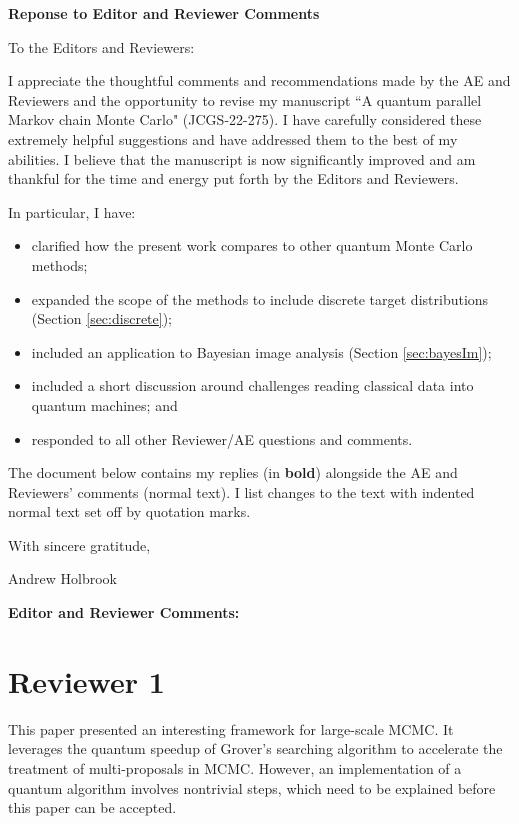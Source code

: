 \documentclass[12pt]{article}
\def\paperTitle{A quantum parallel Markov chain Monte Carlo}
\def\paperID{JCGS-22-275}
\begin{document}


\centerline{\large \bf Reponse to Editor and Reviewer Comments}

To the Editors and Reviewers:

I appreciate the thoughtful comments and recommendations made by the AE and Reviewers and the opportunity to revise my manuscript ``\paperTitle" (\paperID).
I have carefully considered these extremely helpful suggestions and have addressed them to the best of my abilities.  I believe that the manuscript is now significantly improved and am thankful for the time and energy put forth by the Editors and Reviewers.

In particular, I have:
\begin{itemize}
	\item clarified how the present work compares to other quantum Monte Carlo methods;
	
	\item expanded the scope of the methods to include discrete target distributions (Section \ref{sec:discrete});
	
	\item included an application to Bayesian image analysis (Section \ref{sec:bayesIm});
	
	\item included a short discussion around challenges reading classical data into quantum machines; and
	
	\item responded to all other Reviewer/AE questions and comments.
\end{itemize}


The document below contains my replies (in \textbf{bold}) alongside the AE and Reviewers' comments (normal text).  I list changes to the text with indented normal text set off by quotation marks.

With sincere gratitude,

Andrew Holbrook
\clearpage


{\Large \bf Editor and Reviewer Comments:}


\section*{Reviewer 1}


This paper presented an interesting framework for large-scale MCMC. It leverages the quantum speedup of Grover's searching algorithm to accelerate the treatment of multi-proposals in MCMC. However, an implementation of a quantum algorithm involves nontrivial steps, which need to be explained before this paper can be accepted.
\end{document}
